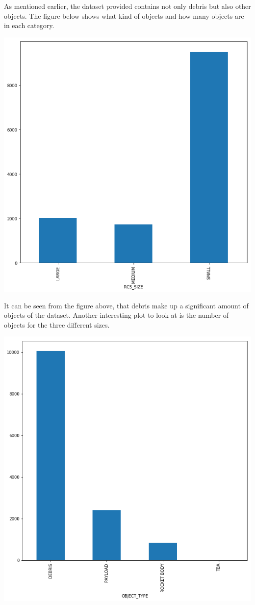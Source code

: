 \documentclass[12pt,a4paper]{article}
\begin{document}
As mentioned earlier, the dataset provided contains not only debris but also other objects. The figure below shows what kind of objects and how many objects are in each category.
\begin{center}
	\includegraphics[scale=0.3]{figures/RCS_size.png}
	\label{fig:RCS_size}
\end{center}
It can be seen from the figure above, that debris make up a significant amount of objects of the dataset. Another interesting plot to look at is the number of objects for the three different sizes.
\begin{center}
	\includegraphics[scale=0.3]{figures/object_types.png}
	\label{fig:object_types}
\end{center}
\end{document}
